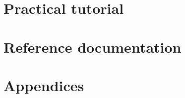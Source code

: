 







\tableofcontents

\mainmatter
{}

\part{Practical tutorial}

%




\part{Reference documentation}










\part{Appendices}




